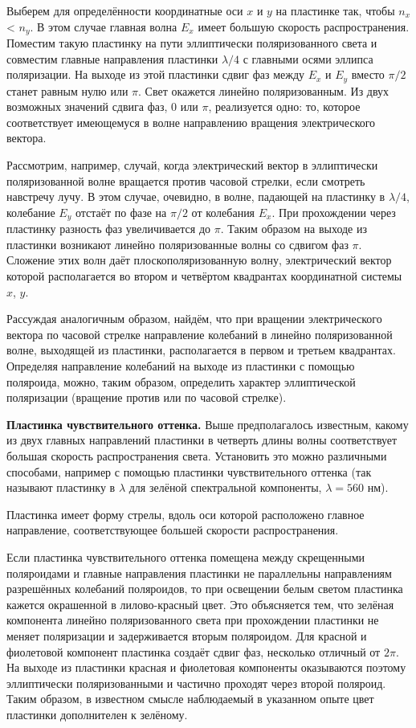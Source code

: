 \documentclass[12pt]{article}
\begin{document}
    Выберем для определённости координатные оси $x$ и $y$ на пластинке так, чтобы $n_x$ < $n_y$.
    В этом случае главная волна $E_x$ имеет большую скорость распространения.
    Поместим такую пластинку на пути эллиптически поляризованного света
    и совместим главные направления пластинки $\lambda/4$ с главными осями эллипса поляризации.
    На выходе из этой пластинки сдвиг фаз между $E_x$ и $E_y$ вместо $\pi/2$ станет равным нулю или $\pi$.
    Свет окажется линейно поляризованным. Из двух возможных значений сдвига фаз, $0$ или $\pi$,
    реализуется одно: то, которое соответствует имеющемуся в волне направлению вращения электрического вектора.

    Рассмотрим, например, случай, когда электрический вектор в эллиптически поляризованной волне вращается против часовой стрелки,
    если смотреть навстречу лучу.
    В этом случае, очевидно, в волне, падающей на пластинку в $\lambda/4$, колебание $E_y$ отстаёт по фазе на $\pi/2$ от
    колебания $E_x$.
    При прохождении через пластинку разность фаз увеличивается до $\pi$. Таким образом на выходе из пластинки возникают
    линейно поляризованные волны со сдвигом фаз $\pi$.
    Сложение этих волн даёт плоскополяризованную волну,
    электрический вектор которой располагается во втором и четвёртом квадрантах координатной системы $x$, $y$.

    Рассуждая аналогичным образом, найдём, что при вращении электрического вектора по часовой стрелке
    направление колебаний в линейно поляризованной волне, выходящей из пластинки,
    располагается в первом и третьем квадрантах.
    Определяя направление колебаний на выходе из пластинки с помощью поляроида,
    можно, таким образом, определить характер эллиптической поляризации (вращение против или по часовой стрелке).

    \textbf{Пластинка чувствительного оттенка.}
    Выше предполагалось известным, какому из двух главных направлений пластинки в четверть
    длины волны соответствует большая скорость распространения света.
    Установить это можно различными способами, например с помощью
    пластинки чувствительного оттенка (так называют пластинку в $\lambda$
    для зелёной спектральной компоненты, $\lambda = 560$ нм).

    Пластинка имеет форму стрелы, вдоль оси которой расположено главное направление, соответствующее большей скорости распространения.

    Если пластинка чувствительного оттенка помещена между скрещенными поляроидами и главные направления пластинки не параллельны
    направлениям разрешённых колебаний поляроидов, то при освещении белым светом пластинка кажется окрашенной в лилово-красный цвет.
    Это объясняется тем, что зелёная компонента линейно поляризованного света при прохождении пластинки
    не меняет поляризации и задерживается вторым поляроидом.
    Для красной и фиолетовой компонент пластинка создаёт сдвиг фаз, несколько отличный от $2\pi$.
    На выходе из пластинки красная и фиолетовая компоненты оказываются
    поэтому эллиптически поляризованными и частично проходят через второй поляроид.
    Таким образом, в известном смысле наблюдаемый в указанном опыте цвет пластинки дополнителен к зелёному.
\end{document}

